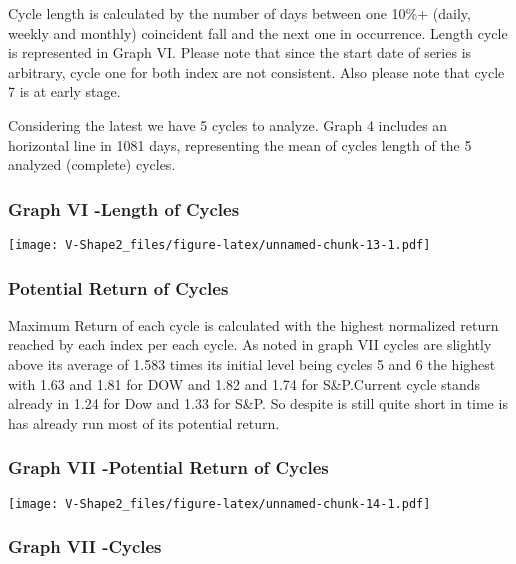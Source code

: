 \documentclass[
]{article}
\begin{document}
Cycle length is calculated by the number of days between one 10\%+
(daily, weekly and monthly) coincident fall and the next one in
occurrence. Length cycle is represented in Graph VI. Please note that
since the start date of series is arbitrary, cycle one for both index
are not consistent. Also please note that cycle 7 is at early stage.

Considering the latest we have 5 cycles to analyze. Graph 4 includes an
horizontal line in 1081 days, representing the mean of cycles length of
the 5 analyzed (complete) cycles.

\hypertarget{graph-vi--length-of-cycles}{%
\subsubsection{Graph VI -Length of
Cycles}\label{graph-vi--length-of-cycles}}

\texttt{[image: V-Shape2\_files/figure-latex/unnamed-chunk-13-1.pdf]}

\hypertarget{potential-return-of-cycles}{%
\subsubsection{Potential Return of
Cycles}\label{potential-return-of-cycles}}

Maximum Return of each cycle is calculated with the highest normalized
return reached by each index per each cycle. As noted in graph VII
cycles are slightly above its average of 1.583 times its initial level
being cycles 5 and 6 the highest with 1.63 and 1.81 for DOW and 1.82 and
1.74 for S\&P.Current cycle stands already in 1.24 for Dow and 1.33 for
S\&P. So despite is still quite short in time is has already run most of
its potential return.

\hypertarget{graph-vii--potential-return-of-cycles}{%
\subsubsection{Graph VII -Potential Return of
Cycles}\label{graph-vii--potential-return-of-cycles}}

\texttt{[image: V-Shape2\_files/figure-latex/unnamed-chunk-14-1.pdf]}

\hypertarget{graph-vii--cycles}{%
\subsubsection{Graph VII -Cycles}\label{graph-vii--cycles}}
\end{document}
